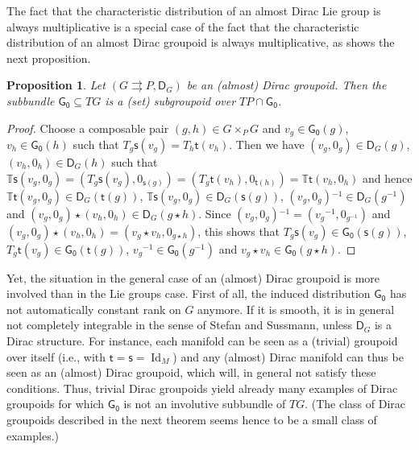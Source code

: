\documentclass{amsart}
\newtheorem{proposition}[theorem]{Proposition}
\theoremstyle{definition}
\begin{document}
The fact that the characteristic distribution of an almost Dirac Lie group
is always multiplicative is a special case of the fact that the 
 characteristic distribution of an almost Dirac groupoid is always multiplicative, as shows the next proposition.
\begin{proposition}\label{G_0_multiplicative}
Let $(G{{\rightrightarrows}} P,\mathsf D_G)$ be an (almost) Dirac groupoid. Then the
subbundle $\mathsf{G_0}\subseteq TG$ is a (set) subgroupoid over $TP\cap\mathsf{G_0}$. 
\end{proposition}
\begin{proof}
Choose a composable pair $(g,h)\in G\times_PG$ and $v_g\in\mathsf{G_0}(g)$, 
$v_h\in\mathsf{G_0}(h)$ such that 
$T_g{{\mathsf{s}}}(v_g)=T_h{{\mathsf{t}}}(v_h)$. Then we have $(v_g, 0_g)\in\mathsf D_G(g)$, 
$(v_h, 0_h)\in\mathsf D_G(h)$
such that 
${{\mathbb{T}}}{{\mathsf{s}}}(v_g,0_g)=(T_g{{\mathsf{s}}}(v_g),0_{{{\mathsf{s}}}(g)})=(T_g{{\mathsf{t}}}(v_h),0_{{{\mathsf{t}}}(h)})={{\mathbb{T}}}{{\mathsf{t}}}(v_h,0_h)$
 and hence 
${{\mathbb{T}}}{{\mathsf{t}}}(v_g,0_g)\in\mathsf D_G({{\mathsf{t}}}(g))$, 
${{\mathbb{T}}}{{\mathsf{s}}}(v_g, 0_g)\in\mathsf D_G({{\mathsf{s}}}(g))$,
$(v_g,0_g){^{-1}}\in\mathsf D_G(g{^{-1}})$
and $(v_g,0_g)\star(v_h,0_h)\in\mathsf D_G(g\star h)$.
Since $(v_g,0_g){^{-1}}=(v_g{^{-1}},0_{g{^{-1}}})$
and $(v_g,0_g)\star(v_h,0_h)=(v_g\star v_h, 0_{g\star h})$, this shows that
$T_g{{\mathsf{s}}}(v_g)\in\mathsf{G_0}({{\mathsf{s}}}(g))$, 
$T_g{{\mathsf{t}}}(v_g)\in\mathsf{G_0}({{\mathsf{t}}}(g))$,
$v_g{^{-1}}\in\mathsf{G_0}(g{^{-1}})$ and 
$v_g\star v_h\in\mathsf{G_0}(g\star h)$.
\end{proof}

Yet, the situation in the general case of an (almost) Dirac groupoid
is more involved than in the Lie groups case. First of all, the induced distribution $\mathsf{G_0}$ has not automatically 
constant rank on $G$ anymore. If it is smooth, it is in general not completely integrable in the sense
of Stefan and Sussmann, unless  $\mathsf D_G$ is a Dirac structure.
For instance, each manifold 
can be seen as a (trivial) groupoid over itself 
(i.e., with ${{\mathsf{t}}}={{\mathsf{s}}}=\operatorname{Id}_M$) and any (almost) Dirac manifold 
can thus be seen as an (almost) Dirac groupoid, which will, 
in general not satisfy these conditions. 
Thus,  trivial Dirac groupoids
yield already many examples of Dirac groupoids for which $\mathsf{G_0}$
is not an involutive subbundle of $TG$.
(The class of Dirac groupoids described in the next theorem
seems hence to be a small class of examples.)
\end{document}
